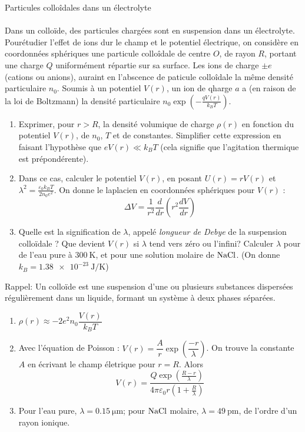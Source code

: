 \documentclass[french, a4paper, 11pt]{article}
\newcommand{\po}{\left(}         %
\newcommand{\pf}{\right)}        %
\newcommand{\pof}[1]{\po #1 \pf} %
\begin{document}
\begin{cadre}{Particules colloîdales dans un électrolyte}
  \paragraph*{}
  Dans un colloïde, des particules chargées sont en suspension dans un électrolyte. Pourétudier l'effet de ions dur le champ et le potentiel électrique, on considère en coordonnées sphériques une particule colloîdale de centre \(O\), de rayon \(R\), portant une charge \(Q\) uniformément répartie sur sa surface.
  Les ions de charge \(\pm e\) (cations ou anions), auraint en l'abscence de paticule colloîdale la même densité particulaire \(n_{0}\). Soumis à un potentiel \(V(r)\), un ion de qharge \(a\) a (en raison de la loi de Boltzmann) la densité particulaire \(n_{0}\exp\pof{-\frac{qV(r)}{k_{B}T}}\).
  \begin{enumerate}[label=\upshape\alph*)]
    \item Exprimer, pour \(r>R\), la densité volumique de charge \(\rho(r)\) en fonction du potentiel \(V(r)\), de \(n_0\), \(T\) et de constantes. Simplifier cette expression en faisant l'hypothèse que \(eV(r)\ll k_{B}T\) (cela signifie que l'agitation thermique est prépondérente).
    \item Dans ce cas, calculer le potentiel \(V(r)\), en posant \(U(r) = rV(r)\) et \(\lambda^{2} = \frac{\varepsilon_{0}k_{B}T}{2n_{0}e^{2}}\).
      On donne le laplacien en coordonnées sphériques pour \(V(r)\) :
      \[\Delta V = \dfrac{1}{r^{2}}\dfrac{d}{dr}\pof{r^{2}\dfrac{dV}{dr}}\]
    \item Quelle est la signification de \(\lambda\), appelé \emph{longueur de Debye} de la suspension colloïdale ? Que devient \(V(r)\) si \(\lambda\) tend vers zéro ou l'infini? Calculer \(\lambda\) pour de l'eau pure à \(\SI{300}{\kelvin}\), et pour une solution molaire de \(\ce{NaCl}\). (On donne \(k_{B} = \SI{1.38e-23}{\joule\per\kelvin}\))
  \end{enumerate}
  Rappel: Un colloïde est une suspension d'une ou plusieurs substances dispersées régulièrement dans un liquide, formant un système à deux phases séparées.
  \tcblower
  \begin{enumerate}[label=\upshape\alph*)]
    \item \(\rho(r) \approx -2e^{2}n_{0}\dfrac{V(r)}{k_{B}T}\)
    \item Avec l'équation de Poisson : \(V(r) = \dfrac{A}{r}\exp\pof{\dfrac{-r}{\lambda}}\). On trouve la constante \(A\) en écrivant le champ életrique pour \(r=R\). Alors
      \[V(r) = \dfrac{Q\exp\pof{\frac{R-r}{\lambda}}}{4\pi\varepsilon_{0}r\pof{1+\frac{R}{\lambda}}}\]
    \item Pour l'eau pure, \(\lambda = \SI{0.15}{\micro\meter}\); pour \(\ce{NaCl}\) molaire, \(\lambda=\SI{49}{\pico\meter}\), de l'ordre d'un rayon ionique.
  \end{enumerate}
\end{cadre}
\end{document}
